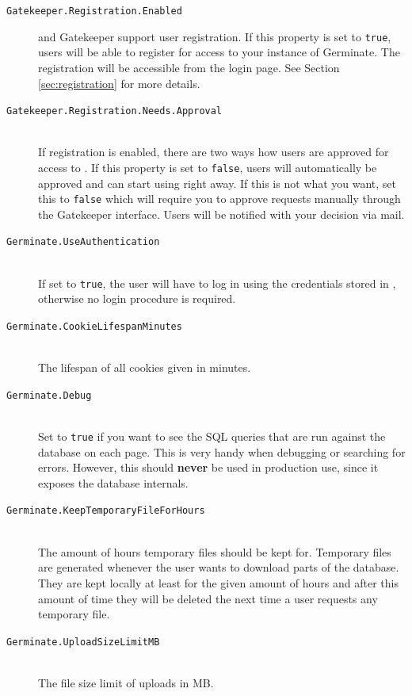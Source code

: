 \begin{description}
    \item[\texttt{Gatekeeper.Registration.Enabled}]  and Gatekeeper support user registration. If this property is set to \texttt{true}, users will be able to register for access to your instance of Germinate. The registration will be accessible from the login page. See Section \ref{sec:registration} for more details.
    \item[\texttt{Gatekeeper.Registration.Needs.Approval}] \\If registration is enabled, there are two ways how users are approved for access to {\germinate}. If this property is set to \texttt{false}, users will automatically be approved and can start using {\germinate} right away. If this is not what you want, set this to \texttt{false} which will require you to approve requests manually through the Gatekeeper interface. Users will be notified with your decision via mail.
    \item[\texttt{Germinate.UseAuthentication}] \\If set to \texttt{true}, the user will have to log in using the credentials stored in {\gatekeeper}, otherwise no login procedure is required.
    \item[\texttt{Germinate.CookieLifespanMinutes}] \\The lifespan of all cookies given in minutes.
    \item[\texttt{Germinate.Debug}] \\Set to \texttt{true} if you want to see the SQL queries that are run against the database on each page. This is very handy when debugging or searching for errors. However, this should \textbf{never} \label{key}be used in production use, since it exposes the database internals.
    \item[\texttt{Germinate.KeepTemporaryFileForHours}] \\The amount of hours temporary files should be kept for. Temporary files are generated whenever the user wants to download parts of the database. They are kept locally at least for the given amount of hours and after this amount of time they will be deleted the next time a user requests any temporary file.
    \item[\texttt{Germinate.UploadSizeLimitMB}] \\The file size limit of uploads in MB.

\end{description}
